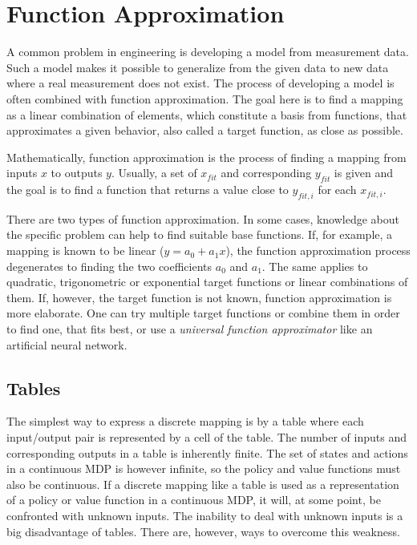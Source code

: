 
\chapter{Function Approximation}
\label{chapter4}

A common problem in engineering is developing a model from measurement data. Such a model makes it possible to generalize from the given data to new data where a real measurement does not exist. The process of developing a model is often combined with function approximation. The goal here is to find a mapping as a linear combination of elements, which constitute a basis from functions, that approximates a given behavior, also called a target function, as close as possible.

Mathematically, function approximation is the process of finding a mapping from inputs $x$ to outputs $y$. Usually, a set of $x_{fit}$ and corresponding $y_{fit}$ is given and the goal is to find a function that returns a value close to $y_{fit,i}$ for each $x_{fit,i}$.

There are two types of function approximation. In some cases, knowledge about the specific problem can help to find suitable base functions. If, for example, a mapping is known to be linear ($y=a_0 + a_1 x$), the function approximation process degenerates to finding the two coefficients $a_0$ and $a_1$. The same applies to quadratic, trigonometric or exponential target functions or linear combinations of them. If, however, the target function is not known, function approximation is more elaborate. One can try multiple target functions or combine them in order to find one, that fits best, or use a \textit{universal function approximator} like an artificial neural network. 

\section{Tables}

The simplest way to express a discrete mapping is by a table where each input/output pair is represented by a cell of the table. The number of inputs and corresponding outputs in a table is inherently finite. The set of states and actions in a continuous MDP is however infinite, so the policy and value functions must also be continuous. If a discrete mapping like a table is used as a representation of a policy or value function in a continuous MDP, it will, at some point, be confronted with unknown inputs. The inability to deal with unknown inputs is a big disadvantage of tables. There are, however, ways to overcome this weakness.

